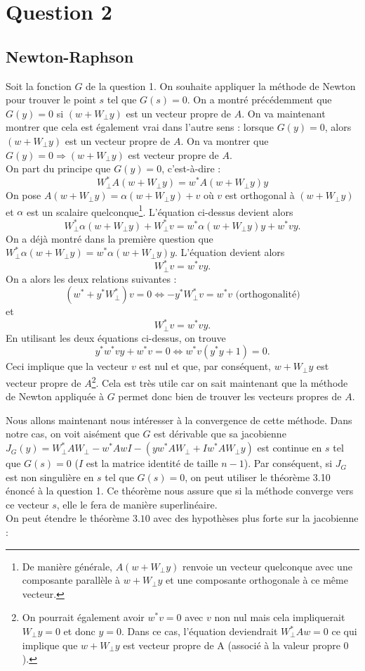 \section*{Question 2}

\subsection*{Newton-Raphson}
Soit la fonction $G$ de la question 1. On souhaite appliquer la méthode de Newton pour trouver le point $s$ tel que $G(s)=0$. On a montré précédemment que $G(y)=0$ si  $(w+ W_{\bot}y)$ est un vecteur propre de $A$. On va maintenant montrer que cela est également vrai dans l'autre sens : lorsque $G(y)=0$, alors $(w+ W_{\bot}y)$ est un vecteur propre de $A$. On va montrer que $G(y)=0 \Rightarrow (w+W_{\bot}y)$ est vecteur propre de $A$.\\
On part du principe que $G(y)=0$, c'est-à-dire :
$$W_{\bot}^*A(w+W_{\bot}y)=w^*A(w+W_{\bot}y)y$$
On pose $A(w+W_{\bot}y) = \alpha (w+W_{\bot}y) + v$ où $v$ est orthogonal à $(w+W_{\bot}y)$ et $\alpha$ est un scalaire quelconque\footnote{De manière générale, $A(w+W_{\bot}y)$ renvoie un vecteur quelconque avec une composante parallèle à $w+W_{\bot}y$ et une composante orthogonale à ce même vecteur.}. L'équation ci-dessus devient alors $$W_{\bot}^*\alpha(w+W_{\bot}y)+W_{\bot}^*v=w^*\alpha(w+W_{\bot}y)y+w^*vy.$$
On a déjà montré dans la première question que $W_{\bot}^*\alpha(w+W_{\bot}y)=w^*\alpha(w+W_{\bot}y)y$. L'équation devient alors $$W_{\bot}^*v=w^*vy.$$
On a alors les deux relations suivantes :
$$(w^*+y^*W_{\bot}^*)v=0 \Leftrightarrow -y^*W_{\bot}^*v = w^*v \text{ (orthogonalité)}$$
et
$$W_{\bot}^*v=w^*vy.$$
En utilisant les deux équations ci-dessus, on trouve
$$y^*w^*vy+w^*v=0 \Leftrightarrow w^*v(y^*y+1)=0.$$
Ceci implique que la vecteur $v$ est nul et que, par conséquent, $w+ W_{\bot}y$ est vecteur propre de $A$\footnote{On pourrait également avoir $w^*v=0$ avec $v$ non nul mais cela impliquerait $W_{\bot}y=0$ et donc $y=0$. Dans ce cas, l'équation deviendrait $W_{\bot}^*Aw=0$ ce qui implique que $w+W_{\bot}y$ est vecteur propre de A (associé à la valeur propre $0$).}. Cela est très utile car on sait maintenant que la méthode de Newton appliquée à $G$ permet donc bien de trouver les vecteurs propres de $A$.

Nous allons maintenant nous intéresser à la convergence de cette méthode. Dans notre cas, on voit aisément que $G$ est dérivable que sa jacobienne $J_G(y) = W_{\bot}^*AW_{\bot} - w^*AwI - (yw^*AW_{\bot}+Iw^*AW_{\bot}y)$ est continue en $s$ tel que $G(s)=0$ ($I$ est la matrice identité de taille $n-1$). Par conséquent, si $J_G$ est non singulière en $s$ tel que $G(s)=0$, on peut utiliser le théorème 3.10 énoncé à la question 1. Ce théorème nous assure que si la méthode converge vers ce vecteur $s$, elle le fera de manière superlinéaire.\\ 
On peut étendre le théorème $3.10$ avec des hypothèses plus forte sur la jacobienne : 

